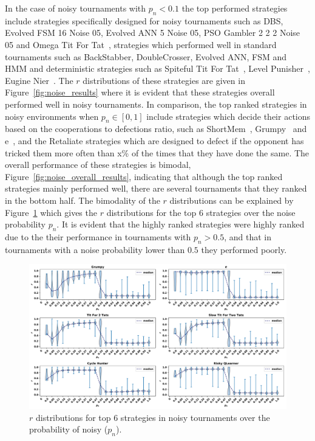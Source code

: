 \documentclass{article}
\begin{document}
In the case of noisy tournaments with \(p_n < 0.1\) the top performed strategies
include strategies specifically designed for noisy tournaments such as DBS,
Evolved FSM 16 Noise 05, Evolved ANN 5 Noise 05, PSO Gambler 2 2 2 Noise 05 and
Omega Tit For Tat~\cite{kendall2007iterated}, strategies which performed well in
standard tournaments such as BackStabber, DoubleCrosser, Evolved ANN, FSM and
HMM and deterministic strategies such as Spiteful Tit For Tat~\cite{prison},
Level Punisher~\cite{Eckhart2015}, Eugine Nier~\cite{lesswrong}. The \(r\) distributions
of these strategies are given in Figure~\ref{fig:noise_results} where it is evident
that these strategies overall performed well in noisy tournaments.
In comparison, the top ranked strategies in noisy environments when \(p_n\in [0,
1]\) include strategies which decide their actions based on the cooperations to
defections ratio, such as ShortMem~\cite{Andre2013},
Grumpy~\cite{axelrodproject} and e~\cite{axelrodproject}, and the Retaliate
strategies which are designed to defect if the opponent has tricked them more
often than x\% of the times that they have done the same. The overall
performance of these strategies is bimodal,
Figure~\ref{fig:noise_overall_results}, indicating that although the top
ranked strategies mainly performed well, there are several tournaments that they
ranked in the bottom half. The bimodality of the \(r\) distributions can be
explained by Figure~\ref{fig:effect_of_noise} which gives the \(r\)
distributions for the top 6 strategies over the noise probability \(p_n\).
It is evident that the highly ranked strategies
were highly ranked due to the their performance in tournaments with \(p_n>0.5\),
and that in tournaments with a noise probability lower than \(0.5\) they
performed poorly.

\begin{figure}[!htbp]
    \centering
    \includegraphics[width=\textwidth]{../images/noise_effect.pdf}
    \caption{\(r\) distributions for top 6 strategies in noisy tournaments over
    the probability of noisy ($p_n$).}
    \label{fig:effect_of_noise}
\end{figure}
\end{document}
